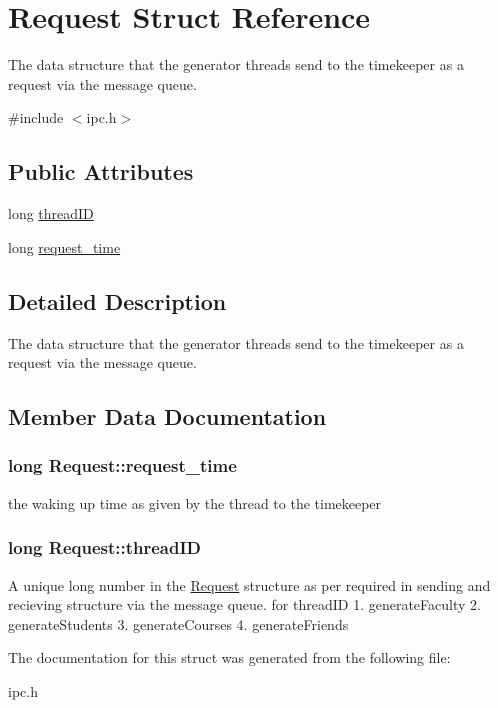 \hypertarget{structRequest}{\section{\-Request \-Struct \-Reference}
\label{structRequest}
}


\-The data structure that the generator threads send to the timekeeper as a request via the message queue.  




{\ttfamily \#include $<$ipc.\-h$>$}

\subsection*{\-Public \-Attributes}
\begin{DoxyCompactItemize}
\item 
long \hyperlink{structRequest_ae857eb230ae4727fde3d5f8887509baa}{thread\-I\-D}
\item 
long \hyperlink{structRequest_a55d8c4e5b09e607a9983bb14e4bc963c}{request\-\_\-time}
\end{DoxyCompactItemize}


\subsection{\-Detailed \-Description}
\-The data structure that the generator threads send to the timekeeper as a request via the message queue. 

\subsection{\-Member \-Data \-Documentation}
\hypertarget{structRequest_a55d8c4e5b09e607a9983bb14e4bc963c}{
\subsubsection[{request\-\_\-time}]{\setlength{\rightskip}{0pt plus 5cm}long {\bf \-Request\-::request\-\_\-time}}}\label{structRequest_a55d8c4e5b09e607a9983bb14e4bc963c}
the waking up time as given by the thread to the timekeeper \hypertarget{structRequest_ae857eb230ae4727fde3d5f8887509baa}{
\subsubsection[{thread\-I\-D}]{\setlength{\rightskip}{0pt plus 5cm}long {\bf \-Request\-::thread\-I\-D}}}\label{structRequest_ae857eb230ae4727fde3d5f8887509baa}
\-A unique long number in the \hyperlink{structRequest}{\-Request} structure as per required in sending and recieving structure via the message queue. for thread\-I\-D 1. generate\-Faculty 2. generate\-Students 3. generate\-Courses 4. generate\-Friends 

\-The documentation for this struct was generated from the following file\-:\begin{DoxyCompactItemize}
\item 
ipc.\-h\end{DoxyCompactItemize}
